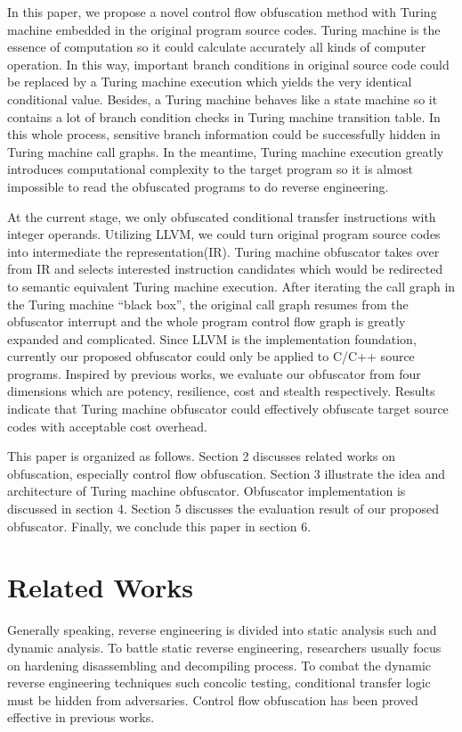 \documentclass[lnicst]{svmultln}
\begin{document}
In this paper, we propose a novel control flow obfuscation method with Turing machine embedded in the original program source codes. Turing machine is the essence of computation so it could calculate accurately all kinds of computer operation. In this way, important branch conditions in original source code could be replaced by a Turing machine execution which yields the very identical conditional value. Besides, a Turing machine behaves like a state machine so it contains a lot of branch condition checks in Turing machine transition table. In this whole process, sensitive branch information could be successfully hidden in Turing machine call graphs. In the meantime, Turing machine execution greatly introduces computational complexity to the target program so it is almost impossible to read the obfuscated programs to do reverse engineering. 

At the current stage, we only obfuscated conditional transfer instructions with integer operands. Utilizing LLVM, we could turn original program source codes into intermediate the representation(IR). Turing machine obfuscator takes over from IR and selects interested instruction candidates which would be redirected to semantic equivalent Turing machine execution. After iterating the call graph in the Turing machine ``black box'', the original call graph resumes from the  obfuscator interrupt and the whole program control flow graph is greatly expanded and complicated. Since LLVM is the implementation foundation, currently our proposed obfuscator could only be applied to C/C++ source programs. Inspired by previous works\cite{Collberg}, we evaluate our obfuscator from four dimensions which are potency, resilience, cost and stealth respectively. Results indicate that Turing machine obfuscator could effectively obfuscate target source codes with acceptable cost overhead.

This paper is organized as follows. Section 2 discusses related works on obfuscation, especially control flow obfuscation. Section 3 illustrate the idea and architecture of Turing machine obfuscator. Obfuscator implementation is discussed in section 4. Section 5 discusses the evaluation result of our proposed obfuscator. Finally, we conclude this paper in section 6.


%
\section{Related Works}
%
Generally speaking, reverse engineering is divided into static analysis such and dynamic analysis. To battle static reverse engineering, researchers usually focus on hardening disassembling and decompiling process. To combat the dynamic reverse engineering techniques such concolic testing, conditional transfer logic must be hidden from adversaries. Control flow obfuscation has been proved effective in previous works.
\end{document}
